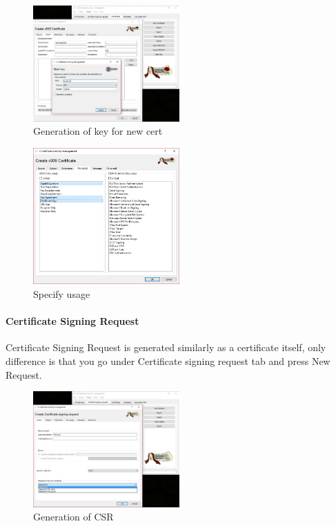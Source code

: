 \documentclass[10pt, a4paper]{report}
\begin{document}
\begin{figure}[!htbp]
 \caption{Generation of key for new cert}
 \centering
  \includegraphics[width=0.5\textwidth]{../Dependancies/XCA/genKey.jpg}
\end{figure}

\begin{figure}[!htbp]
 \caption{Specify usage}
 \centering
  \includegraphics[width=0.5\textwidth]{../Dependancies/XCA/genKey_specif.jpg}
\end{figure}


      \paragraph{Certificate Signing Request}
Certificate Signing Request is generated similarly as a certificate itself, only difference is that you go under Certificate signing request tab and press New Request.
\begin{figure}[!htbp]
 \caption{Generation of CSR}
 \centering
  \includegraphics[width=0.5\textwidth]{../Dependancies/XCA/newCSR.jpg}
\end{figure}
\end{document}
